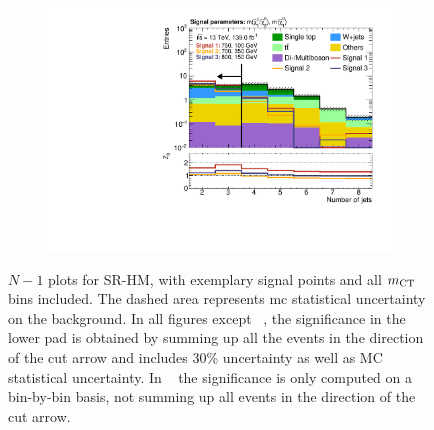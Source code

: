 \begin{figure}
\begin{subfigure}[b]{0.4\linewidth}
		\caption{\label{fig:Wh_reopt_second_round_n1_srhm_mlb1}}
	\end{subfigure}%
	\begin{subfigure}[b]{0.4\linewidth}
		\centering\includegraphics[width=\textwidth]{n1_SRHM_mct_bins/nJet30.pdf}
		\caption{\label{fig:Wh_reopt_second_round_n1_srhm_njet}}
	\end{subfigure}
	\caption{$N-1$ plots for SR-HM, with exemplary signal points and all $m_{\textrm{CT}}$ bins included. The dashed area represents \gls{mc} statistical uncertainty on the background. In all figures except \figname~, the significance in the lower pad is obtained by summing up all the events in the direction of the cut arrow and includes 30\% uncertainty as well as MC statistical uncertainty. In \figname~ the significance is only computed on a bin-by-bin basis, \ie not summing up all events in the direction of the cut arrow.}
	\label{fig:Wh_reopt_second_round_n1_srhm}
\end{figure}




